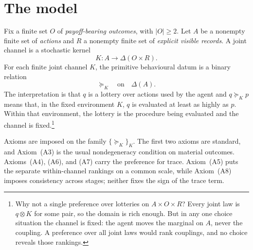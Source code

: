 \documentclass[11pt,a4paper]{article}
\theoremstyle{definition}
\newcommand{\D}{\Delta}
\newcommand{\1}{\mathbf 1}
\begin{document}
\section{The model}\label{sec:model}

Fix a finite set $O$ of \emph{payoff-bearing outcomes}, with $|O|\ge2$.  Let $A$ be a nonempty finite set of
\emph{actions} and $R$ a nonempty finite set of \emph{explicit visible records}.  A joint channel is a stochastic
kernel
\[
  K:A\longrightarrow\D(O\times R).
\]
For each finite joint channel $K$, the primitive behavioural datum is a binary relation
\[
 \succeq_K\quad\text{on}\quad\D(A).
\]
The interpretation is that $q$ is a lottery over actions used by the agent and $q\succeq_Kp$ means that, in the fixed
environment $K$, $q$ is evaluated at least as highly as $p$.  Within that environment, the lottery is the
procedure being evaluated and the channel is fixed.\footnote{Why not a single
preference over lotteries on $A\times O\times R$?  Every joint law is $q\otimes K$ for some pair, so the domain
is rich enough.  But in any one choice situation the channel is fixed: the agent moves the marginal on $A$,
never the coupling.  A preference over all joint laws would rank couplings, and no choice reveals those
rankings.} %

\bigskip
Axioms are imposed on the family $\{\succeq_K\}_K$.
The first two axioms are standard, and Axiom~\textup{(A3)} is the usual nondegeneracy condition on material
outcomes.  Axioms~\textup{(A4)}, \textup{(A6)}, and \textup{(A7)} carry the preference for trace.
Axiom~\textup{(A5)} puts the separate within-channel rankings on a common scale, while
Axiom~\textup{(A8)} imposes consistency across stages; neither fixes the sign of the trace term.
\end{document}
